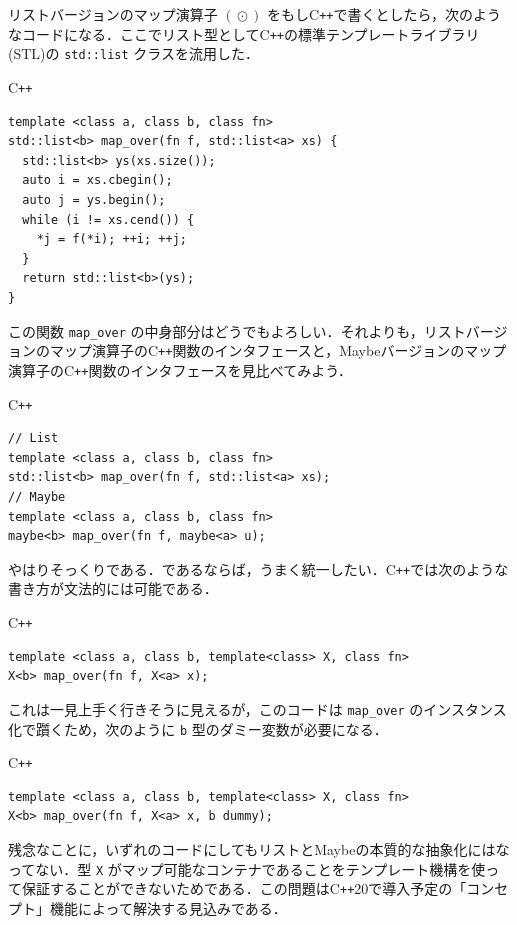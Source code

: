 \documentclass[a5paper,twoside,fleqn,draft]{jsbook}
\newcommand{\programminglanguage}[1]{\textsf{#1}}
\newcommand{\cxx}{\programminglanguage{C}\texttt{++}}
\newcommand{\cxxtwelve}{\cxx\programminglanguage{20}}
\newcommand{\code}[1]{\texttt{#1}}
\newenvironment{cxxcode}{\begin{itembox}[r]{\cxx}}{\end{itembox}}
\DeclareMathOperator{\mMapList}{\odot}
\begin{document}
リストバージョンのマップ演算子 $(\mMapList)$ をもし\cxx で書くとしたら，次のようなコードになる．ここでリスト型として\cxx の標準テンプレートライブラリ(STL)の \code{std::list} クラスを流用した．
\begin{cxxcode}
\begin{verbatim}
template <class a, class b, class fn>
std::list<b> map_over(fn f, std::list<a> xs) {
  std::list<b> ys(xs.size());
  auto i = xs.cbegin();
  auto j = ys.begin();
  while (i != xs.cend()) {
    *j = f(*i); ++i; ++j;
  }
  return std::list<b>(ys);
}
\end{verbatim}
\end{cxxcode}
この関数 \code{map\_over} の中身部分はどうでもよろしい．それよりも，リストバージョンのマップ演算子の\cxx 関数のインタフェースと，Maybeバージョンのマップ演算子の\cxx 関数のインタフェースを見比べてみよう．
\begin{cxxcode}
\begin{verbatim}
// List
template <class a, class b, class fn>
std::list<b> map_over(fn f, std::list<a> xs);
// Maybe
template <class a, class b, class fn>
maybe<b> map_over(fn f, maybe<a> u);
\end{verbatim}
\end{cxxcode}
やはりそっくりである．であるならば，うまく統一したい．\cxx では次のような書き方が文法的には可能である．
\begin{cxxcode}
\begin{verbatim}
template <class a, class b, template<class> X, class fn>
X<b> map_over(fn f, X<a> x);
\end{verbatim}
\end{cxxcode}
これは一見上手く行きそうに見えるが，このコードは \code{map\_over} のインスタンス化で躓くため，次のように \code{b} 型のダミー変数が必要になる．
\begin{cxxcode}
\begin{verbatim}
template <class a, class b, template<class> X, class fn>
X<b> map_over(fn f, X<a> x, b dummy);
\end{verbatim}
\end{cxxcode}
残念なことに，いずれのコードにしてもリストとMaybeの本質的な抽象化にはなってない．型 \code{X} がマップ可能なコンテナであることをテンプレート機構を使って保証することができないためである．この問題は\cxxtwelve で導入予定の「コンセプト」機能によって解決する見込みである．

\end{document}
